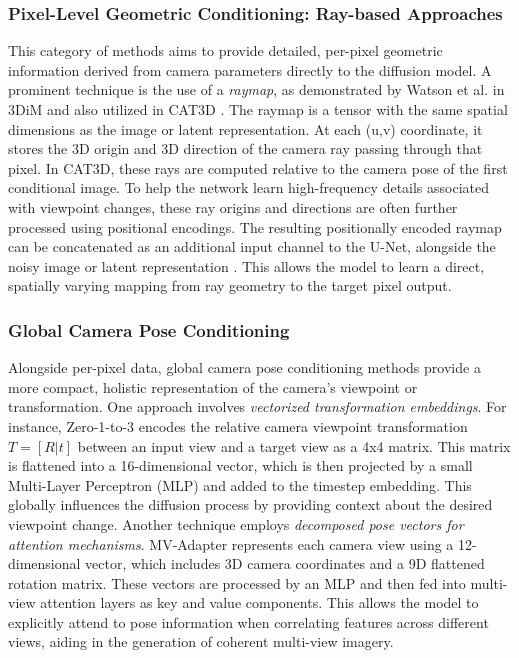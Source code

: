 \subsubsection{Pixel-Level Geometric Conditioning: Ray-based Approaches}
This category of methods aims to provide detailed, per-pixel geometric information derived from camera parameters directly to the diffusion model.
A prominent technique is the use of a \textit{raymap}, as demonstrated by Watson et al. \cite{novelviewsynthesisdiffusion} in 3DiM and also utilized in CAT3D \cite{cat3d}. The raymap is a tensor with the same spatial dimensions as the image or latent representation. At each (u,v) coordinate, it stores the 3D origin and 3D direction of the camera ray passing through that pixel. In CAT3D, these rays are computed relative to the camera pose of the first conditional image.
To help the network learn high-frequency details associated with viewpoint changes, these ray origins and directions are often further processed using positional encodings.
The resulting positionally encoded raymap can be concatenated as an additional input channel to the U-Net, alongside the noisy image or latent representation \cite{novelviewsynthesisdiffusion, cat3d}. This allows the model to learn a direct, spatially varying mapping from ray geometry to the target pixel output.

\subsubsection{Global Camera Pose Conditioning}
Alongside per-pixel data, global camera pose conditioning methods provide a more compact, holistic representation of the camera's viewpoint or transformation.
One approach involves \textit{vectorized transformation embeddings}. For instance, Zero-1-to-3 \cite{zero1to3} encodes the relative camera viewpoint transformation \(T = [R|t]\) between an input view and a target view as a 4x4 matrix. This matrix is flattened into a 16-dimensional vector, which is then projected by a small Multi-Layer Perceptron (MLP) and added to the timestep embedding. This globally influences the diffusion process by providing context about the desired viewpoint change.
Another technique employs \textit{decomposed pose vectors for attention mechanisms}. MV-Adapter \cite{mvadapter} represents each camera view using a 12-dimensional vector, which includes 3D camera coordinates and a 9D flattened rotation matrix. These vectors are processed by an MLP and then fed into multi-view attention layers as key and value components. This allows the model to explicitly attend to pose information when correlating features across different views, aiding in the generation of coherent multi-view imagery.

